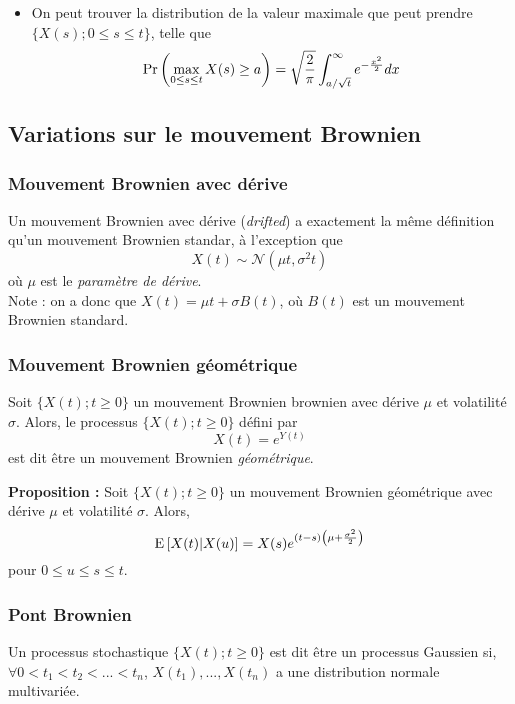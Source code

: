 \documentclass[10pt, french, landscape]{article}
\begin{document}
\begin{multicols*}{2}
\begin{itemize}
\item On peut trouver la distribution de la valeur maximale que peut prendre $\{ X(s) ; 0 \leq s \leq t \}$, telle que
\[\Pr \left( \max_{0 \leq s \leq t} X(s) \geq a \right) =  \sqrt{\frac{2}{\pi}} \int_{a / \sqrt{t}}^{\infty} e^{- \frac{x^2}{2}} dx\]
\end{itemize}


\subsection*{Variations sur le mouvement Brownien}
\subsubsection*{Mouvement Brownien avec dérive}
Un mouvement Brownien avec dérive (\emph{drifted}) a exactement la même définition qu'un mouvement Brownien standar, à l'exception que
\[X(t) \sim \mathcal{N} \left(\mu t, \sigma^2 t \right) \]
où $\mu$ est le \emph{paramètre de dérive}.\\
 Note : on a donc que $X(t) = \mu t + \sigma B(t)$, où $B(t)$ est un mouvement Brownien standard.

\subsubsection*{Mouvement Brownien géométrique}
\begin{definition}[Définition]
Soit $\{X(t) ; t \geq 0 \}$ un mouvement Brownien brownien avec dérive $\mu$ et volatilité $\sigma$. Alors, le processus $\{X(t) ; t \geq 0 \}$ défini par
\[X(t) = e^{Y(t)}\]
est dit être un mouvement Brownien \emph{géométrique}.
\end{definition}
\textbf{Proposition : } Soit $\{X(t) ; t \geq 0 \}$ un mouvement Brownien géométrique avec dérive $\mu$ et volatilité $\sigma$. Alors,
\[\mathrm{E} \left[ X(t) | X(u) \right] = X(s) e^{(t-s) \left(\mu + \frac{\sigma^2}{2} \right)} \]
pour $ 0 \leq u \leq s \leq t$.

\subsubsection*{Pont Brownien}
\begin{definition}
Un processus stochastique $\{X(t) ; t \geq 0 \}$ est dit être un processus Gaussien si, $\forall 0 < t_1 < t_2 < ... < t_n$, $X(t_1), ..., X(t_n)$ a une distribution normale multivariée.
\end{definition}


\end{multicols*}
\end{document}
